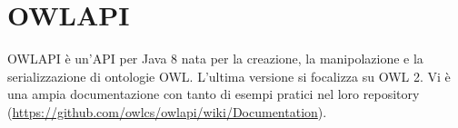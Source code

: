 \section{OWLAPI}
OWLAPI \`e un'API per Java 8 nata per la creazione, la manipolazione e la serializzazione di ontologie OWL.
L'ultima versione si focalizza su OWL 2.
Vi \`e una ampia documentazione con tanto di esempi pratici nel loro repository (\url{https://github.com/owlcs/owlapi/wiki/Documentation}).